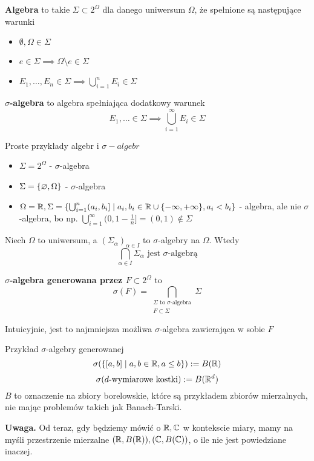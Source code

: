 \begin{definition}
	\textbf{Algebra} to takie \(\Sigma \subset 2^{\Omega}\) dla danego uniwersum \(\Omega\), że spełnione są następujące warunki
	\begin{itemize}
		\item \(\emptyset, \Omega \in \Sigma\)
		\item \(e \in \Sigma \implies \Omega \setminus e \in \Sigma\)
		\item \(E_1, \dots, E_n \in \Sigma \implies \bigcup_{i=1}^n E_i \in \Sigma\)
	\end{itemize}
\end{definition}

\begin{definition}
	\textbf{\(\sigma\)-algebra} to algebra spełniająca dodatkowy warunek
	\[
		E_1, \dots \in \Sigma \implies \bigcup_{i=1}^{\infty} E_i \in \Sigma
	\]
\end{definition}

\begin{example}
	Proste przykłady algebr i \(\sigma-algebr\)
	\begin{itemize}
		\item \(\Sigma = 2^{\Omega}\) - \(\sigma\)-algebra
		\item \(\Sigma = \set{\emptyset, \Omega}\) - \(\sigma\)-algebra
		\item \(\Omega = \real, \Sigma = \set{\bigcup_{i=1}^n (a_i, b_i] \mid a_i, b_i \in \real \cup \set{-\infty, +\infty}, a_i < b_i}\) - algebra, ale nie \(\sigma\)-algebra, bo np. \(\bigcup_{i=1}^\infty (0, 1 - \frac{1}{n}] = (0, 1) \notin \Sigma\)
	\end{itemize}
\end{example}

\begin{lemma}
	Niech \(\Omega\) to uniwersum, a \((\Sigma_\alpha)_{\alpha \in I}\) to \(\sigma\)-algebry na \(\Omega\). Wtedy
	\[
		\bigcap_{\alpha \in I} \Sigma_\alpha \text{ jest \(\sigma\)-algebrą}
	\]
\end{lemma}

\begin{definition}
	\textbf{\(\sigma\)-algebra generowana przez \(F \subset 2^\Omega\)} to
	\[
		\sigma(F) = \bigcap_{\substack{\Sigma \text{ to } \sigma\text{-algebra}\\F \subset \Sigma}} \Sigma
	\]
	
	Intuicyjnie, jest to najmniejsza możliwa \(\sigma\)-algebra zawierająca w sobie \(F\)
\end{definition}

\begin{example}
	Przykład \(\sigma\)-algebry generowanej
	\[
		\sigma(\set{[a, b] \mid a, b \in \real, a \leq b}) := B(\real)
	\]
	\[
		\sigma(d\text{-wymiarowe kostki}) := B(\mathbb{R}^d)
	\]
	\(B\) to oznaczenie na zbiory borelowskie, które są przykładem zbiorów mierzalnych, nie mając problemów takich jak Banach-Tarski.
	
	\textbf{Uwaga. } Od teraz, gdy będziemy mówić o \(\mathbb{R}, \mathbb{C}\) w kontekscie miary, mamy na myśli przestrzenie mierzalne \((\mathbb{R}, B(\mathbb{R})), (\mathbb{C}, B(\mathbb{C}))\), o ile nie jest powiedziane inaczej.
\end{example}
